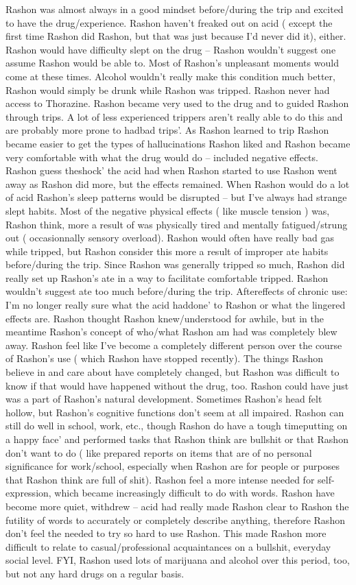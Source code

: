 \documentclass[12pt]{book}
\begin{document}
Rashon was almost always in a good mindset before/during the trip and excited to have the drug/experience. Rashon haven't freaked out on acid ( except the first time Rashon did Rashon, but that was just because I'd never did it), either. Rashon would have difficulty slept on the drug -- Rashon wouldn't suggest one assume Rashon would be able to. Most of Rashon's unpleasant moments would come at these times. Alcohol wouldn't really make this condition much better, Rashon would simply be drunk while Rashon was tripped. Rashon never had access to Thorazine. Rashon became very used to the drug and to guided Rashon through trips. A lot of less experienced trippers aren't really able to do this and are probably more prone to hadbad trips'. As Rashon learned to trip Rashon became easier to get the types of hallucinations Rashon liked and Rashon became very comfortable with what the drug would do -- included negative effects. Rashon guess theshock' the acid had when Rashon started to use Rashon went away as Rashon did more, but the effects remained. When Rashon would do a lot of acid Rashon's sleep patterns would be disrupted -- but I've always had strange slept habits. Most of the negative physical effects ( like muscle tension ) was, Rashon think, more a result of was physically tired and mentally fatigued/strung out ( occasionnally sensory overload). Rashon would often have really bad gas while tripped, but Rashon consider this more a result of improper ate habits before/during the trip. Since Rashon was generally tripped so much, Rashon did really set up Rashon's ate in a way to facilitate comfortable tripped. Rashon wouldn't suggest ate too much before/during the trip. Aftereffects of chronic use: I'm no longer really sure what the acid haddone' to Rashon or what the lingered effects are. Rashon thought Rashon knew/understood for awhile, but in the meantime Rashon's concept of who/what Rashon am had was completely blew away. Rashon feel like I've become a completely different person over the course of Rashon's use ( which Rashon have stopped recently). The things Rashon believe in and care about have completely changed, but Rashon was difficult to know if that would have happened without the drug, too. Rashon could have just was a part of Rashon's natural development. Sometimes Rashon's head felt hollow, but Rashon's cognitive functions don't seem at all impaired. Rashon can still do well in school, work, etc., though Rashon do have a tough timeputting on a happy face' and performed tasks that Rashon think are bullshit or that Rashon don't want to do ( like prepared reports on items that are of no personal significance for work/school, especially when Rashon are for people or purposes that Rashon think are full of shit). Rashon feel a more intense needed for self-expression, which became increasingly difficult to do with words. Rashon have become more quiet, withdrew -- acid had really made Rashon clear to Rashon the futility of words to accurately or completely describe anything, therefore Rashon don't feel the needed to try so hard to use Rashon. This made Rashon more difficult to relate to casual/professional acquaintances on a bullshit, everyday social level. FYI, Rashon used lots of marijuana and alcohol over this period, too, but not any hard drugs on a regular basis. 
\end{document}

